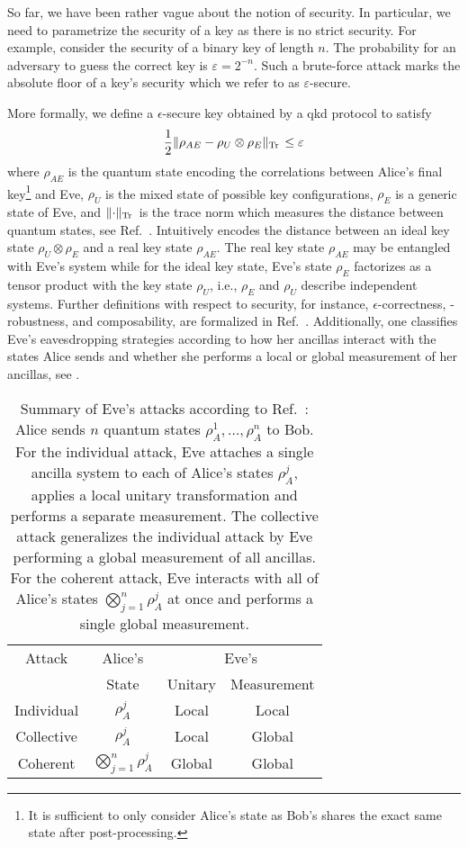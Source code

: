 So far, we have been rather vague about the notion of security.
In particular, we need to parametrize the security of a key as there is no strict security.
For example, consider the security of a binary key of length $n$.
The probability for an adversary to guess the correct key is $\varepsilon=2^{-n}$.
Such a brute-force attack marks the absolute floor of a key's security which we refer to as $\varepsilon$-secure.

More formally, we define a $\epsilon$-secure key obtained by a \gls{qkd} protocol to satisfy~\cite[p.~10]{Scarani2009}
\begin{equation}
	\frac{1}{2}
	\lVert\rho_{AE}-\rho_U\otimes\rho_E\rVert_{\operatorname{Tr}{}}
	\leq
	\varepsilon
	\label{eq:qkd_security}
\end{equation}
where $\rho_{AE}$ is the quantum state encoding the correlations between Alice's final key\footnote{It is sufficient to only consider Alice's state as Bob's shares the exact same state after post-processing.} and Eve, $\rho_U$ is the mixed state of possible key configurations, $\rho_E$ is a generic state of Eve, and $\lVert\cdot\rVert_{\operatorname{Tr}{}}$ is the trace norm which measures the distance between quantum states, see Ref.~\cite[p.~49]{Wolf2021}.
Intuitively  encodes the distance between an ideal key state $\rho_U\otimes\rho_E$ and a real key state $\rho_{AE}$.
The real key state $\rho_{AE}$ may be entangled with Eve's system while for the ideal key state, Eve's state $\rho_E$ factorizes as a tensor product with the key state $\rho_U$, i.e., $\rho_E$ and $\rho_U$ describe independent systems.
Further definitions with respect to security, for instance, $\epsilon$-correctness, -robustness, and composability, are formalized in Ref.~\cite[p.~119]{Wolf2021}.
Additionally, one classifies Eve's eavesdropping strategies according to how her ancillas interact with the states Alice sends and whether she performs a local or global measurement of her ancillas, see .
\begin{table}[htb]
	\centering
	\begin{tabular}{cccc}
		\toprule
			Attack & Alice's & \multicolumn{2}{c}{Eve's} \\
			& State & Unitary & Measurement \\
		\midrule
			Individual & $\rho_A^j$ & Local & Local \\
			Collective & $\rho_A^j$ & Local & Global \\
			Coherent & $\bigotimes_{j=1}^n\rho_A^j$ & Global & Global \\
		\bottomrule
	\end{tabular}
	\caption{Summary of Eve's attacks according to Ref.~\cite[p.~128]{Wolf2021}: Alice sends $n$ quantum states $\rho_A^1,\dots,\rho_A^n$ to Bob. For the individual attack, Eve attaches a single ancilla system to each of Alice's states $\rho_A^j$, applies a local unitary transformation and performs a separate measurement. The collective attack generalizes the individual attack by Eve performing a global measurement of all ancillas. For the coherent attack, Eve interacts with all of Alice's states $\bigotimes_{j=1}^n\rho_A^j$ at once and performs a single global measurement.}\label{tab:eavesdropping_strategies}
\end{table}
